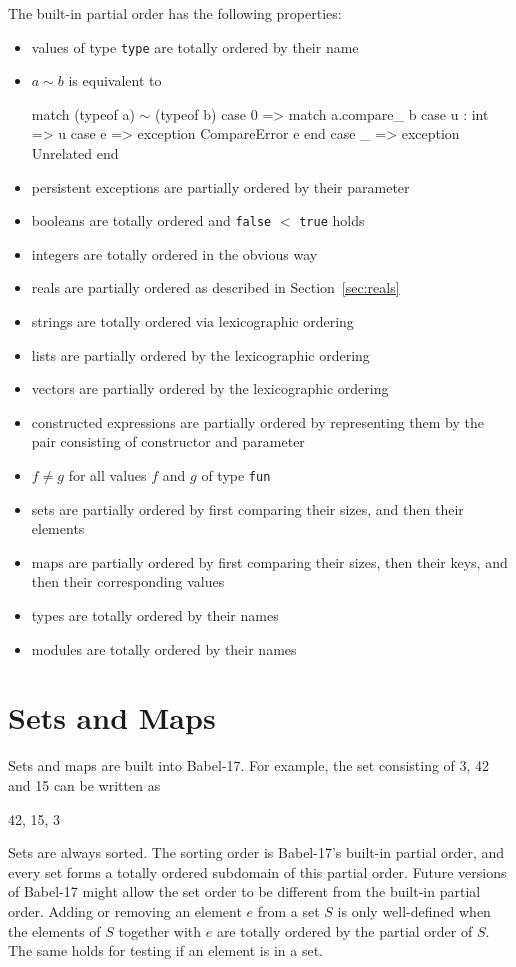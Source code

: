 \documentclass[11pt]{amsart}
\newcommand{\babelsrc}[1] {\lstinline!#1!}
\begin{document}
The built-in partial order has the following properties:
\begin{itemize}
\item values of type \texttt{type} are totally ordered by their name
\item $a \sim b$ is equivalent to
\begin{babellisting}
match (typeof a) $\sim$ (typeof b)
  case 0 => 
    match a.compare_ b
      case u : int => u
      case e => exception CompareError e
    end
  case _ => exception Unrelated
end
\end{babellisting}
\item persistent exceptions are partially ordered by their parameter 
 \item booleans are totally ordered and \babelsrc{false} $<$ \babelsrc{true} holds
 \item integers are totally ordered in the obvious way
  \item reals are partially ordered as described in Section~\ref{sec:reals}
\item strings are totally ordered via lexicographic ordering
\item lists are partially ordered by the lexicographic ordering 
\item vectors are partially ordered by the lexicographic ordering 
\item constructed expressions are partially ordered by representing them by the pair consisting of constructor and parameter
\item $f \neq g$ for all values $f$ and $g$ of type \texttt{fun}
\item sets are partially ordered by first comparing their sizes, and then their elements 
\item maps are partially ordered by first comparing their sizes, then their keys, and then their corresponding values
\item types are totally ordered by their names
\item modules are totally ordered by their names
\end{itemize}

\section{Sets and Maps}\label{sec:setsandmaps}
Sets and maps are built into Babel-17. For example, the set consisting of 3, 42 and 15 can be written as
\begin{babellisting}
{42, 15, 3}
\end{babellisting}
Sets are always sorted. The sorting order is Babel-17's built-in partial order, and every set forms a totally ordered subdomain of this partial order. Future versions of Babel-17 might allow the set order to be different from the built-in partial order. Adding or removing an element $e$ from a set $S$ is only well-defined when the elements of $S$ together with $e$ are totally ordered by the partial order of $S$. The same holds for testing if an element is in a set. 
\end{document}
